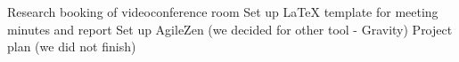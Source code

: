 \nextItem Research booking of videoconference room 
\nextItem Set up LaTeX template for meeting minutes and report 
\nextItem Set up AgileZen (we decided for other tool - Gravity)
\nextItem Project plan (we did not finish) 
